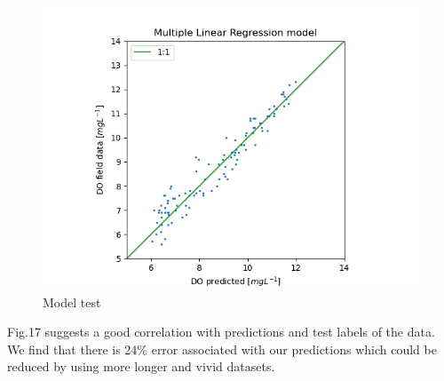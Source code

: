 \begin{figure}[H]
    \centering
    \includegraphics[scale=1.0]{figs/plots/mlr_test.png}
    \caption{Model test}
\end{figure}

Fig.17 suggests a good correlation with predictions and test labels of the data. We find that there is 24\% error associated with our predictions which could be reduced by using more longer and vivid datasets.